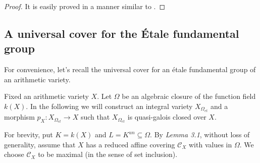 \documentclass[12pt,twoside,reqno]{amsart}
\theoremstyle{definition}
\numberwithin{equation}{section}
\begin{document}
\begin{proof}
It is easily proved in a manner similar to \cite{An7}.
\end{proof}

\subsection{A universal cover for the \'{E}tale fundamental group}

For convenience, let's recall the universal cover for an \'{e}tale fundamental group of an arithmetic variety.

Fixed an arithmetic variety $X$. Let $\Omega$ be an algebraic closure of the function field $k(X)$.
In the following we will construct an integral variety $X_{\Omega _{et}}$ and a morphism $p_{X}:X_{\Omega _{et}} \to X$ such that $X_{\Omega _{et}}$ is quasi-galois closed over $X$.

For brevity, put $K=k\left( X\right) $ and $L=K^{un}\subseteq \Omega .$
By \emph{Lemma 3.1}, without loss of generality, assume that $X$ has a reduced affine covering $\mathcal{C}_{X}$ with values in $\Omega .$
We choose $\mathcal{C}_{X}$ to be maximal (in the sense of set inclusion).
\end{document}
